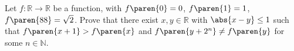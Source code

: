 Let $f : \mathbb{R} \to \mathbb{R}$ be a function, with
$f\paren{0} = 0$,
$f\paren{1} = 1$,
$f\paren{88} = \sqrt{2}$.
Prove that there exist $x,y \in \mathbb{R}$ with $\abs{x - y} \leq 1$
such that $f\paren{x + 1} > f\paren{x}$ and
$f\paren{y + 2^n} \neq f\paren{y}$ for some $n \in \mathbb{N}$.
